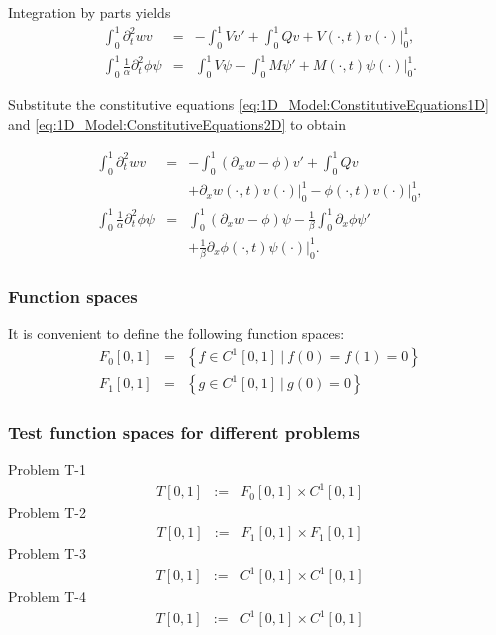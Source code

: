 \documentclass[../../main.tex]{subfiles}
\begin{document}
Integration by parts yields
\begin{eqnarray*}
	\int_{0}^{1} \partial_{t}^{2} w v &=&  - \int_{0}^{1}V v'  + \int_{0}^{1} Q v + V(\cdot,t) v(\cdot) |_0^1,\\
	\int_{0}^{1}\frac{1}{\alpha} \partial_{t}^{2} \phi \psi  &=& \int_{0}^{1}V \psi - \int_{0}^{1}M \psi' + M(\cdot,t) \psi(\cdot) |_0^1.
\end{eqnarray*}

Substitute the constitutive equations \eqref{eq:1D_Model:ConstitutiveEquations1D} and \eqref{eq:1D_Model:ConstitutiveEquations2D} to obtain

\begin{eqnarray}
	\int_{0}^{1} \partial_{t}^{2} w v  &=& -\int_{0}^{1}(\partial_x w-\phi) v'  + \int_{0}^{1} Q v \nonumber\\
	& & + \left. \partial_x w(\cdot,t) v(\cdot) \right |_0^1 -\left. \phi(\cdot,t) v(\cdot) \right |_0^1, \label{TGT_13}\\
	\int_{0}^{1}\frac{1}{\alpha} \partial_{t}^{2} \phi \psi  &=&  \int_{0}^{1} (\partial_x w - \phi) \psi   - \frac{1}{\beta} \int_{0}^{1}\partial_x \phi \psi' \nonumber \\
	& &+ \frac{1}{\beta}\partial_x \phi(\cdot,t) \psi(\cdot) |_0^1 .\label{TGT_14}
\end{eqnarray}
\subsubsection{Function spaces}\label{sssec:1D_Model:FunctionSpace}
It is convenient to define the following function spaces:
\begin{eqnarray}
	F_0[0,1] & = & \left\{f \in C^1[0,1] \ | \ f(0) = f(1) = 0 \right\} \label{eq:1D_Model:FunctionSpace1}\\
	F_1[0,1] & = & \left\{g \in C^1[0,1] \ | \ g(0) = 0 \right\} \label{eq:1D_Model:FunctionSpace2}
\end{eqnarray}

\subsubsection{Test function spaces for different problems}\label{sssec:1D_Model:TestFunction}
Problem T-1
\begin{eqnarray*}
	T[0,1] &:=& F_0[0,1] \times C^1[0,1]
\end{eqnarray*}
Problem T-2
\begin{eqnarray*}
		T[0,1] &:=& F_1[0,1] \times F_1[0,1]
\end{eqnarray*}
Problem T-3 
\begin{eqnarray*}
	T[0,1] &:=&  C^1[0,1]\times C^1[0,1]
\end{eqnarray*}
Problem T-4
\begin{eqnarray*}
		T[0,1] &:=& C^1[0,1] \times C^1[0,1]
\end{eqnarray*}
\end{document}
